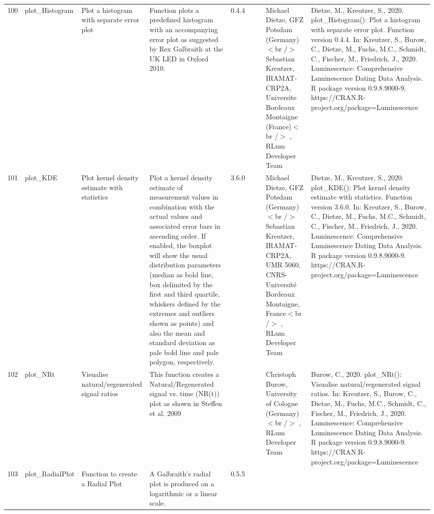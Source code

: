 \begin{table}[ht]
\begin{tabular}{rllllllll}
 \\ 
  100 & plot\_Histogram & Plot a histogram with separate error plot & Function plots a predefined histogram with an accompanying error plot as suggested by Rex Galbraith at the UK LED in Oxford 2010. & 0.4.4
 &  &  & Michael Dietze, GFZ Potsdam (Germany) $<$br /$>$ Sebastian Kreutzer, IRAMAT-CRP2A, Universite Bordeaux Montaigne (France)$<$br /$>$ , RLum Developer Team & Dietze, M., Kreutzer, S., 2020. plot\_Histogram(): Plot a histogram with separate error plot. Function version 0.4.4. In: Kreutzer, S., Burow, C., Dietze, M., Fuchs, M.C., Schmidt, C., Fischer, M., Friedrich, J., 2020. Luminescence: Comprehensive Luminescence Dating Data Analysis. R package version 0.9.8.9000-9. https://CRAN.R-project.org/package=Luminescence
 \\ 
  101 & plot\_KDE & Plot kernel density estimate with statistics & Plot a kernel density estimate of measurement values in combination with the actual values and associated error bars in ascending order. If enabled, the boxplot will show the usual distribution parameters (median as bold line, box delimited by the first and third quartile, whiskers defined by the extremes and outliers shown as points) and also the mean and standard deviation as pale bold line and pale polygon, respectively. & 3.6.0
 &  &  & Michael Dietze, GFZ Potsdam (Germany) $<$br /$>$ Sebastian Kreutzer, IRAMAT-CRP2A, UMR 5060, CNRS-Université Bordeaux Montaigne, France$<$br /$>$ , RLum Developer Team & Dietze, M., Kreutzer, S., 2020. plot\_KDE(): Plot kernel density estimate with statistics. Function version 3.6.0. In: Kreutzer, S., Burow, C., Dietze, M., Fuchs, M.C., Schmidt, C., Fischer, M., Friedrich, J., 2020. Luminescence: Comprehensive Luminescence Dating Data Analysis. R package version 0.9.8.9000-9. https://CRAN.R-project.org/package=Luminescence
 \\ 
  102 & plot\_NRt & Visualise natural/regenerated signal ratios & This function creates a Natural/Regenerated signal vs. time (NR(t)) plot as shown in Steffen et al. 2009 &  &  &  & Christoph Burow, University of Cologne (Germany)$<$br /$>$ , RLum Developer Team & Burow, C., 2020. plot\_NRt(): Visualise natural/regenerated signal ratios. In: Kreutzer, S., Burow, C., Dietze, M., Fuchs, M.C., Schmidt, C., Fischer, M., Friedrich, J., 2020. Luminescence: Comprehensive Luminescence Dating Data Analysis. R package version 0.9.8.9000-9. https://CRAN.R-project.org/package=Luminescence
 \\ 
  103 & plot\_RadialPlot & Function to create a Radial Plot & A Galbraith's radial plot is produced on a logarithmic or a linear scale. & 0.5.5

\end{tabular}
\end{table}
